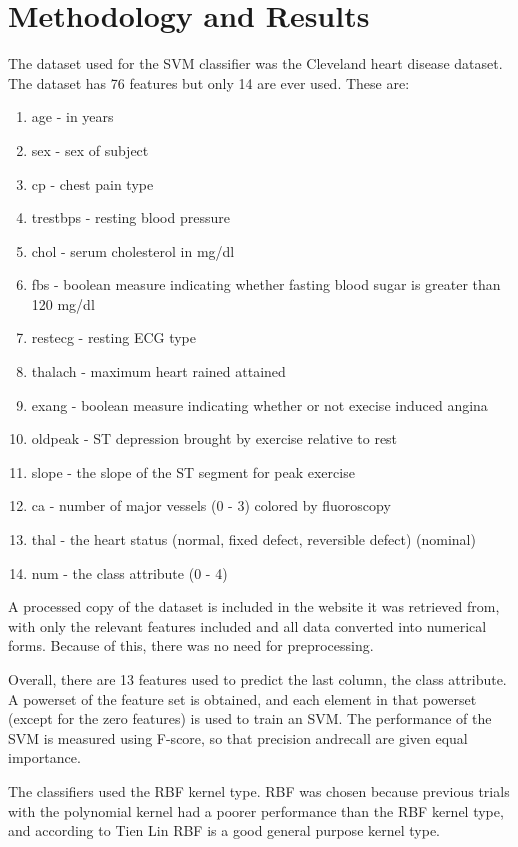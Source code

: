 \documentclass[conference]{IEEEtran}
\begin{document}
\section{Methodology and Results}
	The dataset used for the SVM classifier was the Cleveland heart disease dataset.
	The dataset has 76 features but only 14 are ever used. These are:
	\begin{enumerate}
	  \item age - in years
      \item sex - sex of subject     
      \item cp - chest pain type
      \item trestbps - resting blood pressure
      \item chol - serum cholesterol in mg/dl
	  \item fbs - boolean measure indicating whether fasting blood sugar is greater than 120 mg/dl
      \item restecg - resting ECG type
      \item thalach - maximum heart rained attained
      \item exang - boolean measure indicating whether or not execise induced angina
      \item oldpeak - ST depression brought by exercise relative to rest
      \item slope - the slope of the ST segment for peak exercise
	  \item ca - number of major vessels (0 - 3) colored by fluoroscopy        
      \item thal - the heart status (normal, fixed defect, reversible defect) (nominal) 
	  \item num - the class attribute (0 - 4) 
	\end{enumerate}
	A processed copy of the dataset is included in the website it was retrieved from, with only the relevant features included and all data converted into numerical forms.
	Because of this, there was no need for preprocessing.

	Overall, there are 13 features used to predict the last column, the class attribute.
	A powerset of the feature set is obtained, and each element in that powerset (except for the zero features) is used to train an SVM.
	The performance of the SVM is measured using F-score, so that precision andrecall are given equal importance.

	The classifiers used the RBF kernel type.
	RBF was chosen because previous trials with the polynomial kernel had a poorer performance than the RBF kernel type, and according to Tien Lin \cite{bib:rbf} RBF is a good general purpose kernel type.
\end{document}
